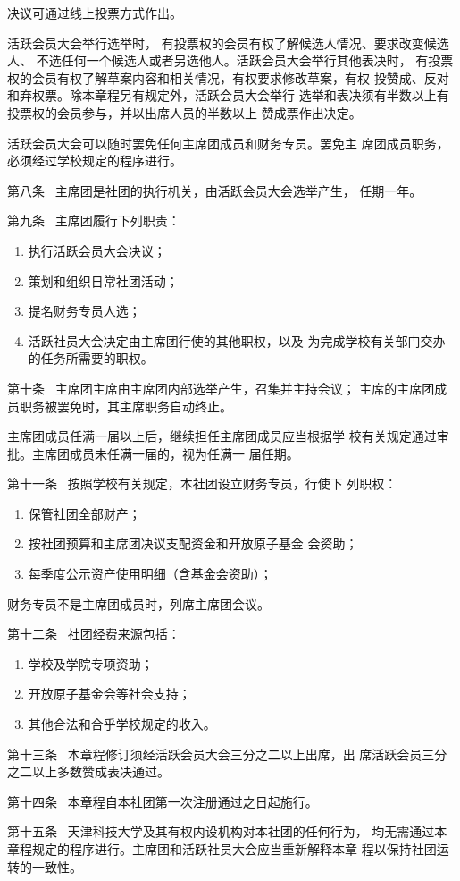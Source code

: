 \documentclass{gbt9704}
\begin{document}
决议可通过线上投票方式作出。

活跃会员大会举行选举时，
有投票权的会员有权了解候选人情况、要求改变候选人、
不选任何一个候选人或者另选他人。活跃会员大会举行其他表决时，
有投票权的会员有权了解草案内容和相关情况，有权要求修改草案，有权
投赞成、反对和弃权票。除本章程另有规定外，活跃会员大会举行
选举和表决须有半数以上有投票权的会员参与，并以出席人员的半数以上
赞成票作出决定。


活跃会员大会可以随时罢免任何主席团成员和财务专员。罢免主
席团成员职务，必须经过学校规定的程序进行。


第八条~ 主席团是社团的执行机关，由活跃会员大会选举产生，
任期一年。


第九条~ 主席团履行下列职责：
\begin{enumerate}
    \item 执行活跃会员大会决议；
    \item 策划和组织日常社团活动；
    \item 提名财务专员人选；
    \item 活跃社员大会决定由主席团行使的其他职权，以及
    为完成学校有关部门交办的任务所需要的职权。
\end{enumerate}


第十条~ 主席团主席由主席团内部选举产生，召集并主持会议；
主席的主席团成员职务被罢免时，其主席职务自动终止。

主席团成员任满一届以上后，继续担任主席团成员应当根据学
校有关规定通过审批。主席团成员未任满一届的，视为任满一
届任期。

第十一条~ 按照学校有关规定，本社团设立财务专员，行使下
列职权：
\begin{enumerate}
    \item 保管社团全部财产；
    \item 按社团预算和主席团决议支配资金和开放原子基金
    会资助；
    \item 每季度公示资产使用明细（含基金会资助）；
\end{enumerate}


财务专员不是主席团成员时，列席主席团会议。


第十二条~ 社团经费来源包括：
\begin{enumerate}
    \item 学校及学院专项资助；
    \item 开放原子基金会等社会支持；
    \item 其他合法和合乎学校规定的收入。
\end{enumerate}


第十三条~ 本章程修订须经活跃会员大会三分之二以上出席，出
席活跃会员三分之二以上多数赞成表决通过。


第十四条~ 本章程自本社团第一次注册通过之日起施行。

第十五条~ 天津科技大学及其有权内设机构对本社团的任何行为，
均无需通过本
章程规定的程序进行。主席团和活跃社员大会应当重新解释本章
程以保持社团运转的一致性。
\end{document}
